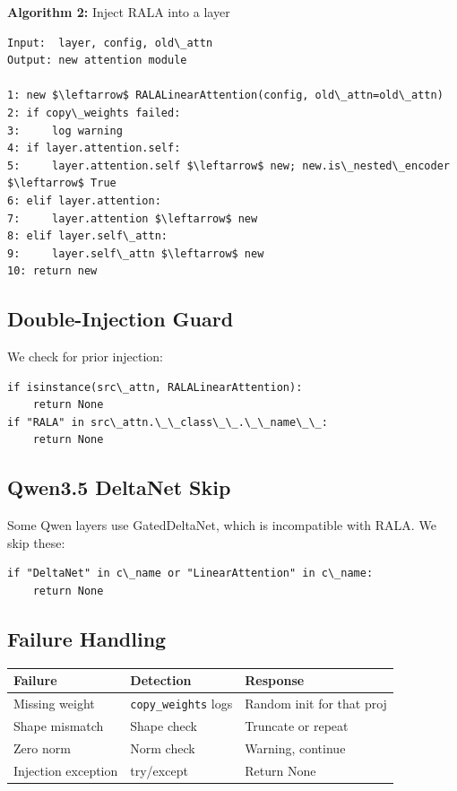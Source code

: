 \textbf{Algorithm 2:} Inject RALA into a layer
\begin{lstlisting}
Input:  layer, config, old\_attn
Output: new attention module

1: new $\leftarrow$ RALALinearAttention(config, old\_attn=old\_attn)
2: if copy\_weights failed:
3:     log warning
4: if layer.attention.self:
5:     layer.attention.self $\leftarrow$ new; new.is\_nested\_encoder $\leftarrow$ True
6: elif layer.attention:
7:     layer.attention $\leftarrow$ new
8: elif layer.self\_attn:
9:     layer.self\_attn $\leftarrow$ new
10: return new
\end{lstlisting}

\subsection{Double-Injection Guard}

We check for prior injection:

\begin{lstlisting}
if isinstance(src\_attn, RALALinearAttention):
    return None
if "RALA" in src\_attn.\_\_class\_\_.\_\_name\_\_:
    return None
\end{lstlisting}

\subsection{Qwen3.5 DeltaNet Skip}

Some Qwen layers use GatedDeltaNet, which is incompatible with RALA. We 
skip these:

\begin{lstlisting}
if "DeltaNet" in c\_name or "LinearAttention" in c\_name:
    return None
\end{lstlisting}

\subsection{Failure Handling}

\begin{table}[H]
\centering
\small
\begin{tabular}{lll}
\toprule
\textbf{Failure} & \textbf{Detection} & \textbf{Response} \\
\midrule
Missing weight & \texttt{copy\_weights} logs & Random init for that proj \\
Shape mismatch & Shape check & Truncate or repeat \\
Zero norm & Norm check & Warning, continue \\
Injection exception & try/except & Return None \\
\bottomrule
\end{tabular}
\end{table}

